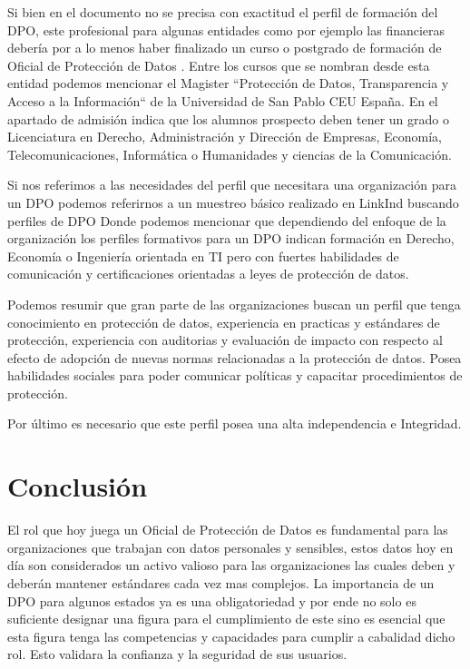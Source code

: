 \documentclass[stu, 11pt, letterpaper, donotrepeattitle, floatsintext, natbib]{apa7}
\begin{document}
 Si bien en el documento no se precisa con exactitud el perfil de formación del DPO, este profesional para algunas entidades como por ejemplo las financieras debería por a lo menos haber finalizado un curso o postgrado de formación de Oficial de Protección de Datos \citep{santanderdpo}. Entre los cursos que se nombran desde esta entidad podemos mencionar el Magister ``Protección de Datos, Transparencia y Acceso a la Información`` \citep{univceu} de la Universidad  de San Pablo CEU España. En el apartado de admisión indica que los alumnos prospecto deben tener un grado o Licenciatura en Derecho, Administración y Dirección de Empresas, Economía, Telecomunicaciones, Informática o Humanidades y ciencias de la Comunicación.
 
 Si nos referimos a las necesidades del perfil que necesitara una organización para un DPO podemos referirnos a un muestreo básico realizado en LinkInd buscando perfiles de DPO \citep{dpojob} Donde podemos mencionar que dependiendo del enfoque de la organización los perfiles formativos para un DPO indican formación en Derecho, Economía o Ingeniería orientada en TI pero con fuertes habilidades de comunicación y certificaciones orientadas a leyes de protección de datos.
 
 Podemos resumir que gran parte de las organizaciones buscan un perfil que tenga conocimiento en protección de datos, experiencia en practicas y estándares de protección, experiencia con auditorias y evaluación de impacto con respecto al efecto de adopción de nuevas normas relacionadas a la protección de datos. Posea habilidades sociales para poder comunicar políticas y capacitar procedimientos de protección.
 
  Por último es necesario que este perfil posea una alta independencia e Integridad.
 

\newpage

\section{\large Conclusión}

El rol que hoy juega un Oficial de Protección de Datos es fundamental para las organizaciones que trabajan con datos personales y sensibles, estos datos hoy en día son considerados un activo valioso para las organizaciones las cuales deben y deberán mantener estándares cada vez mas complejos. La importancia de un DPO para algunos estados ya es una obligatoriedad y por ende no solo es suficiente designar una figura para el cumplimiento de este sino es esencial que esta figura tenga las competencias y capacidades para cumplir a cabalidad dicho rol. Esto validara la confianza y la seguridad de sus usuarios.
\end{document}
